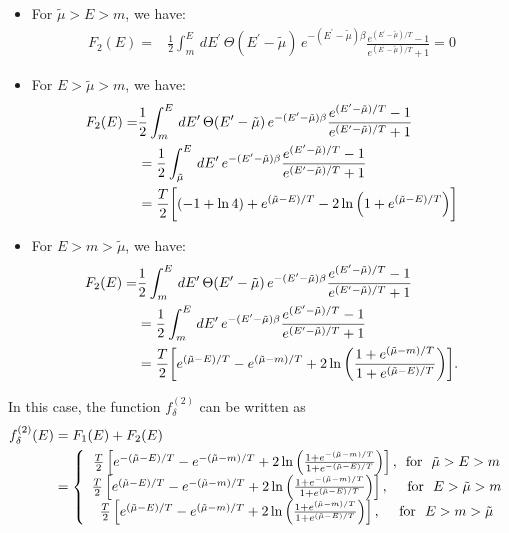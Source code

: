 \documentclass[sn-mathphys,Numbered]{sn-jnl}
\theoremstyle{thmstyleone}%
\theoremstyle{thmstyletwo}%
\theoremstyle{thmstylethree}%
\begin{document}
\begin{itemize}
 \item For $\tilde\mu>E>m$, we have:
\begin{align}
F_2(E)=&\frac{1}{2}\int^{E}_{m}\,dE^\prime\,\Theta(E^\prime-\tilde\mu)\,e^{-(E^\prime-\tilde\mu)\beta}\frac{e^{(E^\prime-\tilde\mu)/T}-1}{e^{(E^\prime-\tilde\mu)/T}+1}=0
\end{align}
  \item For $E>\tilde\mu>m$, we have:
\begin{align}
F_2(E)=&\frac{1}{2}\int^{E}_{m}\,dE^\prime\,\Theta(E^\prime-\tilde\mu)\,e^{-(E^\prime-\tilde\mu)\beta}\frac{e^{(E^\prime-\tilde\mu)/T}-1}{e^{(E^\prime-\tilde\mu)/T}+1}\\
&=\frac{1}{2}\int^{E}_{\tilde\mu}\,dE^\prime\,e^{-(E^\prime-\tilde\mu)\beta}\frac{e^{(E^\prime-\tilde\mu)/T}-1}{e^{(E^\prime-\tilde\mu)/T}+1}\notag\\
&=\frac{T}{2}\bigg[(-1+\ln4)+e^{(\tilde\mu-E)/T} -2\ln{\left(1+e^{(\tilde\mu-E)/T}\right)}\bigg]
\end{align}
  \item For $E>m>\tilde\mu$, we have:
\begin{align}
F_2(E)=&\frac{1}{2}\int^{E}_{m}\,dE^\prime\,\Theta(E^\prime-\tilde\mu)\,e^{-(E^\prime-\tilde\mu)\beta}\frac{e^{(E^\prime-\tilde\mu)/T}-1}{e^{(E^\prime-\tilde\mu)/T}+1}\\
&=\frac{1}{2}\int^{E}_{m}\,dE^\prime\,e^{-(E^\prime-\tilde\mu)\beta}\frac{e^{(E^\prime-\tilde\mu)/T}-1}{e^{(E^\prime-\tilde\mu)/T}+1}\notag\\
&=\frac{T}{2}\bigg[e^{(\tilde\mu-E)/T}-e^{(\tilde\mu-m)/T}+2\ln{\left(\frac{1+e^{(\tilde\mu-m)/T}}{1+e^{(\tilde\mu-E)/T}}\right)}\bigg].
\end{align}
\end{itemize}
In this case, the function  $f^{(2)}_\delta$ can be written as
\begin{align}
f^{(2)}_\delta(E)&=F_1(E)+F_2(E)\notag\\
&=\left\{\begin{array}{c}
\frac{T}{2}\left[e^{-(\tilde\mu-E)/T}-e^{-(\tilde\mu-m)/T}+2\ln{\left(\frac{1+e^{-(\tilde\mu-m)/T}}{1+e^{-(\tilde\mu-E)/T}}\right)}\right],\,\,\,\mathrm{for}\,\,\,\,\tilde\mu>E>m \\ 
\frac{T}{2}\left[e^{(\tilde\mu-E)/T}-e^{-(\tilde\mu-m)/T}+2\ln{\left(\frac{1+e^{-(\tilde\mu-m)/T}}{1+e^{(\tilde\mu-E)/T}}\right)}\right],\,\,\,\,\,\,\,\,\mathrm{for}\,\,\,\,E>\tilde\mu>m \\
\frac{T}{2}\left[e^{(\tilde\mu-E)/T}-e^{(\tilde\mu-m)/T}+2\ln{\left(\frac{1+e^{(\tilde\mu-m)/T}}{1+e^{(\tilde\mu-E)/T}}\right)}\right],\,\,\,\,\,\,\,\,\mathrm{for}\,\,\,\,E>m>\tilde\mu
\end{array}\right.
\end{align}
\end{document}
